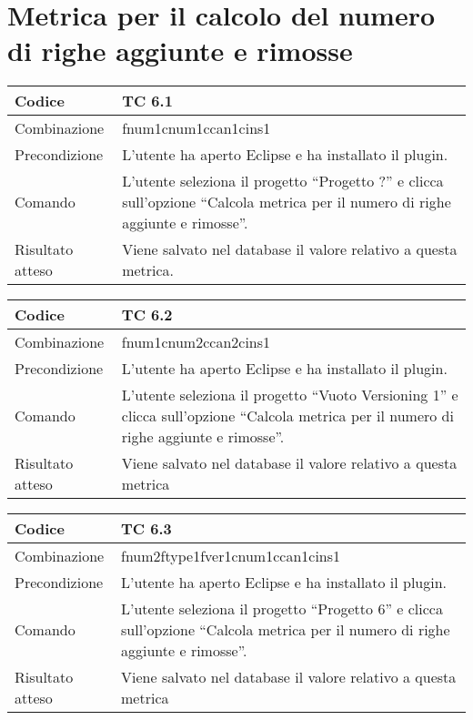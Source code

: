 \clearpage

\section{Metrica per il calcolo del numero di righe aggiunte e rimosse}

\begin{table}[ht]
\begin{tabular}{|p{3cm}|p{9cm}|}
\hline
\cellcolor{lightgray}Codice				& TC 6.1								\\
\hline
\cellcolor{lightgray}Combinazione		& fnum1cnum1ccan1cins1									\\
\hline
\cellcolor{lightgray}Precondizione		& L'utente ha aperto Eclipse e ha installato il plugin.		\\
\hline
\cellcolor{lightgray}Comando			& L'utente seleziona il progetto ``Progetto ?''  e clicca sull'opzione ``Calcola metrica per il numero di righe aggiunte e rimosse''.	\\
\hline
\cellcolor{lightgray}Risultato atteso	& Viene salvato nel database il valore relativo a questa metrica.\\
\hline
\end{tabular}
\end{table}

\begin{table}[ht]
\begin{tabular}{|p{3cm}|p{9cm}|}
\hline
\cellcolor{lightgray}Codice				& TC 6.2								\\
\hline
\cellcolor{lightgray}Combinazione		& fnum1cnum2ccan2cins1								\\
\hline
\cellcolor{lightgray}Precondizione		& L'utente ha aperto Eclipse e ha installato il plugin.					\\
\hline
\cellcolor{lightgray}Comando			& L'utente seleziona il progetto ``Vuoto Versioning 1''  e clicca sull'opzione ``Calcola metrica per il numero di righe aggiunte e rimosse''.	\\
\hline
\cellcolor{lightgray}Risultato atteso	& Viene salvato nel database il valore relativo a questa metrica	\\
\hline
\end{tabular}
\end{table}

\begin{table}[ht]
\begin{tabular}{|p{3cm}|p{9cm}|}
\hline
\cellcolor{lightgray}Codice				& TC 6.3								\\
\hline
\cellcolor{lightgray}Combinazione		& fnum2ftype1fver1cnum1ccan1cins1 									\\
\hline
\cellcolor{lightgray}Precondizione		& L'utente ha aperto Eclipse e ha installato il plugin.			\\
\hline
\cellcolor{lightgray}Comando			& L'utente seleziona il progetto ``Progetto 6''  e clicca sull'opzione ``Calcola metrica per il numero di righe aggiunte e rimosse''.	\\
\hline
\cellcolor{lightgray}Risultato atteso	& Viene salvato nel database il valore relativo a questa metrica	\\
\hline
\end{tabular}
\end{table}

